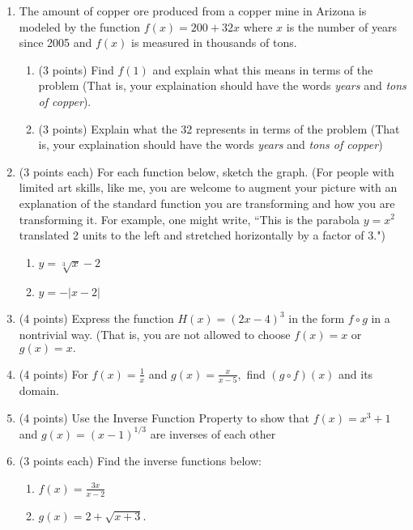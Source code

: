 \documentclass[11pt]{article}
\begin{document}
\begin{enumerate}
\item The amount of copper ore produced from a copper mine in Arizona is modeled by the function $f(x)=200+32x$ where $x$ is the number of years since 2005 and $f(x)$ is measured in thousands of tons.
\begin{enumerate}
\item (3 points) Find $f(1)$ and explain what this means in terms of the problem (That is, your explaination should have the words  {\it{years}} and {\it{tons of copper}}). \vspace{1in}
\item (3 points) Explain what the 32 represents in terms of the problem (That is, your explaination should have the words  {\it{years}} and {\it{tons of copper}})
\vspace{1in}
\end{enumerate}
\item (3 points each) For each function below, sketch the graph. (For people with limited art skills, like me, you are welcome to augment your picture with an explanation of the standard function you are transforming and how you are transforming it. For example, one might write, ``This is the parabola $y=x^2$ translated 2 units to the left and stretched horizontally by a factor of 3.")
\begin{enumerate}
\item $y=\sqrt[3]{x}-2$
\vfill
\item $y=-|x-2|$
\vfill
\end{enumerate}
\item (4 points) Express the function $H(x)=(2x-4)^3$ in the form $f \circ g$ in a nontrivial way. (That is, you are not allowed to choose $f(x)=x$ or $g(x)=x.$
\vspace{.75in}
\newpage
\item (4 points) For $f(x)=\frac{1}{x}$ and $g(x)=\frac{x}{x-5},$ find $(g \circ f)(x)$ and its domain.
\vfill
\item (4 points) Use the Inverse Function Property to show that $f(x)=x^3+1$ and $g(x)=(x-1)^{1/3}$ are inverses of each other
\vfill
\item (3 points each) Find the inverse functions below: 
\begin{enumerate}
\item $f(x)=\frac{3x}{x-2}$
\vfill
\item $g(x)=2+\sqrt{x+3}.$
\vfill
\end{enumerate}
\end{enumerate}
\end{document}
